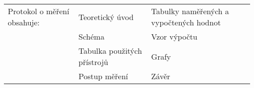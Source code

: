 \hspace*{-3mm}
\begin{tabular}{lll}%
  Protokol o měření obsahuje: & Teoretický úvod             & Tabulky naměřených a vypočtených hodnot \\
   & Schéma                      & Vzor výpočtu                            \\
   & Tabulka použitých přístrojů & Grafy                                   \\
   & Postup měření               & Závěr                                   \\
\end{tabular}
